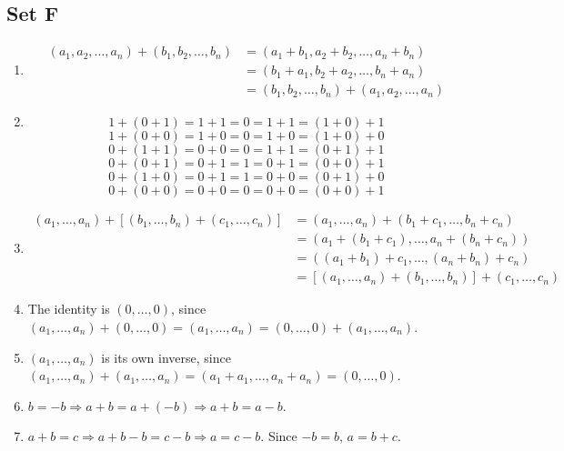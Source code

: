 \subsection{Set F}
\begin{enumerate}
    \item \begin{equation*}
            \begin{split}
                (a_1, a_2, \ldots, a_n) + (b_1, b_2, \ldots, b_n) & = (a_1 + b_1, a_2 + b_2, \ldots, a_n + b_n) \\
                                                                   & = (b_1 + a_1, b_2 + a_2, \ldots, b_n + a_n) \\
                                                                  & = (b_1, b_2, \ldots, b_n) + (a_1, a_2, \ldots, a_n)
            \end{split}
        \end{equation*}
    \item 
        $$1 + (0 + 1) = 1 + 1 = 0 = 1 + 1 = (1 + 0) + 1$$
        $$1 + (0 + 0) = 1 + 0 = 0 = 1 + 0 = (1 + 0) + 0$$
        $$0 + (1 + 1) = 0 + 0 = 0 = 1 + 1 = (0 + 1) + 1$$
        $$0 + (0 + 1) = 0 + 1 = 1 = 0 + 1 = (0 + 0) + 1$$
        $$0 + (1 + 0) = 0 + 1 = 1 = 0 + 0 = (0 + 1) + 0$$
        $$0 + (0 + 0) = 0 + 0 = 0 = 0 + 0 = (0 + 0) + 1$$
    \item
        \begin{equation*}
            \begin{split}
                (a_1, \ldots, a_n) + [(b_1, \ldots, b_n) + (c_1, \ldots, c_n)] & = (a_1, \ldots, a_n) + (b_1 + c_1, \ldots, b_n + c_n) \\
                                                                               & = (a_1 + (b_1 + c_1), \ldots, a_n + (b_n + c_n)) \\
                                                                               & = ((a_1 + b_1) + c_1, \ldots, (a_n + b_n) + c_n) \\
                                                                               & = [(a_1, \ldots, a_n) + (b_1, \ldots, b_n)] + (c_1, \ldots, c_n)
            \end{split}
        \end{equation*}
    \item The identity is $(0, \ldots, 0)$, since $(a_1, \ldots, a_n) + (0, \ldots, 0) = (a_1, \ldots, a_n) = (0, \ldots, 0) + (a_1, \ldots, a_n)$.
    \item $(a_1, \ldots, a_n)$ is its own inverse, since $(a_1, \ldots, a_n) + (a_1, \ldots, a_n) = (a_1 + a_1, \ldots, a_n + a_n) = (0, \ldots, 0)$.
    \item $b = -b \Rightarrow a + b = a + (-b) \Rightarrow a + b = a - b$.
    \item $a + b = c \Rightarrow a + b - b = c - b \Rightarrow a = c - b$. Since $-b = b$, $a = b + c$.
\end{enumerate}

